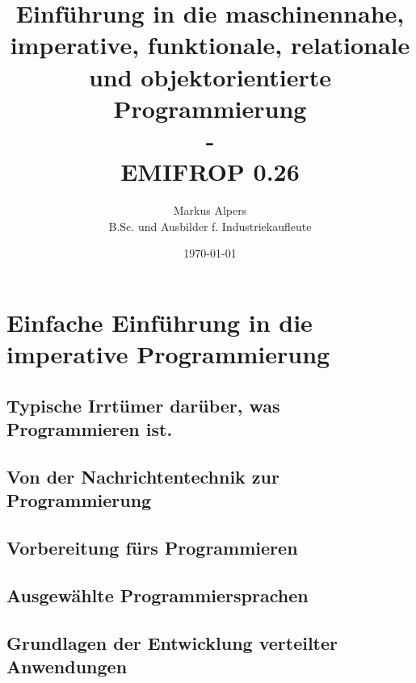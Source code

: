 \documentclass[11pt, a4paper, oneside, draft]{book}
\begin{document}

\title{Einführung in die maschinennahe, imperative, funktionale, relationale und objektorientierte Programmierung\\-\\EMIFROP 0.26}
\author{Markus Alpers\\B.Sc. und Ausbilder f. Industriekaufleute}
\date{\today}

\maketitle


\tableofcontents


%

\part{Einfache Einführung in die imperative Programmierung}

%
\chapter[Das ist Programmieren (wirklich)]{Typische Irrtümer darüber, was Programmieren ist.}
%
\chapter[Nachrichtentechnik und Programmierung]{Von der Nachrichtentechnik zur Programmierung}
%
\chapter{Vorbereitung fürs Programmieren}
%
\chapter{Ausgewählte Programmiersprachen}

%
\chapter[Grundlagen verteilter Anwendungen]{Grundlagen der Entwicklung verteilter Anwendungen}

%
%
\end{document}
